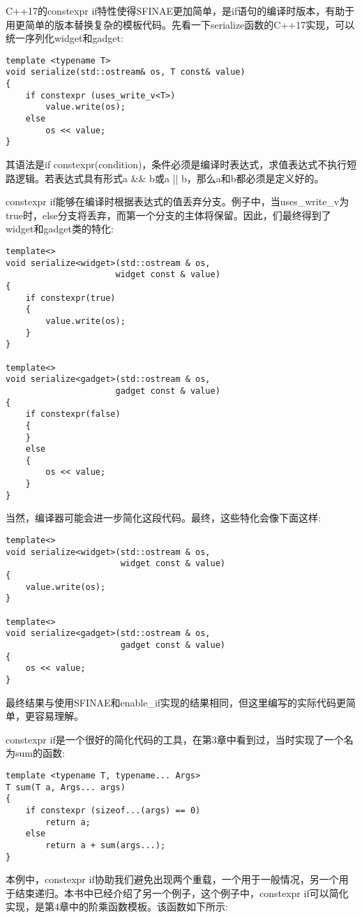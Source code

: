 C++17的constexpr if特性使得SFINAE更加简单，是if语句的编译时版本，有助于用更简单的版本替换复杂的模板代码。先看一下serialize函数的C++17实现，可以统一序列化widget和gadget:

\begin{lstlisting}[style=styleCXX]
template <typename T>
void serialize(std::ostream& os, T const& value)
{
	if constexpr (uses_write_v<T>)
		value.write(os);
	else
		os << value;
}
\end{lstlisting}

其语法是if constexpr(condition)，条件必须是编译时表达式，求值表达式不执行短路逻辑。若表达式具有形式a \&\& b或a || b，那么a和b都必须是定义好的。

constexpr if能够在编译时根据表达式的值丢弃分支。例子中，当uses\_write\_v为true时，else分支将丢弃，而第一个分支的主体将保留。因此，们最终得到了widget和gadget类的特化:

\begin{lstlisting}[style=styleCXX]
template<>
void serialize<widget>(std::ostream & os,
                      widget const & value)
{
	if constexpr(true)
	{
		value.write(os);
	}
}

template<>
void serialize<gadget>(std::ostream & os,
                      gadget const & value)
{
	if constexpr(false)
	{
	}
	else
	{
		os << value;
	}
}
\end{lstlisting}

当然，编译器可能会进一步简化这段代码。最终，这些特化会像下面这样:

\begin{lstlisting}[style=styleCXX]
template<>
void serialize<widget>(std::ostream & os,
                       widget const & value)
{
	value.write(os);
}

template<>
void serialize<gadget>(std::ostream & os,
					   gadget const & value)
{
	os << value;
}
\end{lstlisting}

最终结果与使用SFINAE和enable\_if实现的结果相同，但这里编写的实际代码更简单，更容易理解。

constexpr if是一个很好的简化代码的工具，在第3章中看到过，当时实现了一个名为sum的函数:

\begin{lstlisting}[style=styleCXX]
template <typename T, typename... Args>
T sum(T a, Args... args)
{
	if constexpr (sizeof...(args) == 0)
		return a;
	else
		return a + sum(args...);
}
\end{lstlisting}

本例中，constexpr if协助我们避免出现两个重载，一个用于一般情况，另一个用于结束递归。本书中已经介绍了另一个例子，这个例子中，constexpr if可以简化实现，是第4章中的阶乘函数模板。该函数如下所示:

